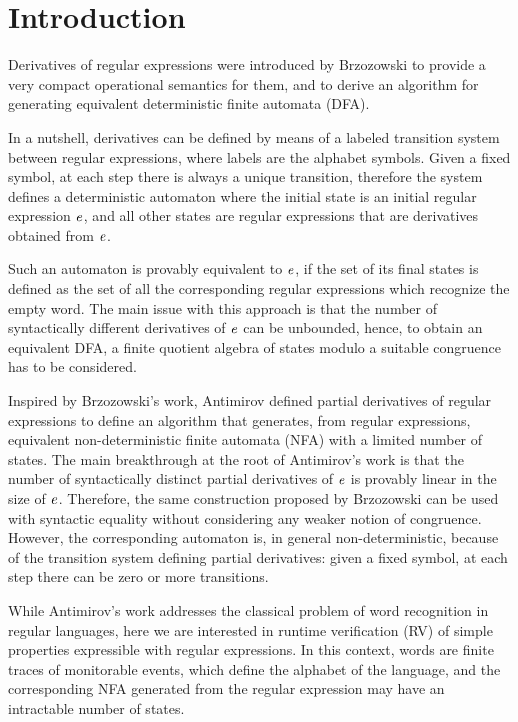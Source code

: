 \section{Introduction}\label{sec:intro}

Derivatives of regular expressions were introduced by Brzozowski \cite{Brzozowski64}
to provide a very compact operational semantics for them, and to derive an algorithm for generating equivalent deterministic finite automata (DFA).

In a nutshell, derivatives can be defined by means of a labeled transition system between regular expressions, where labels are the alphabet symbols. Given a fixed symbol, at each step there is always a unique transition, therefore the system defines a deterministic automaton where the initial state is an initial regular expression $\mathit {e}$, and all other states are regular expressions that are derivatives obtained from $\mathit {e}$.

Such an automaton is provably equivalent to $\mathit {e}$,
if the set of its final states is defined as the set of all the corresponding regular expressions which recognize the empty word.
The main issue with this approach is that the number of syntactically different derivatives of $\mathit {e}$ can be unbounded, hence, to obtain an equivalent DFA, a finite quotient algebra of states modulo a suitable congruence has to be considered.

Inspired by Brzozowski's work, Antimirov \cite{Antimirov96} defined partial derivatives of regular expressions to define an algorithm that generates, from regular expressions, equivalent non-deterministic finite automata (NFA) with a limited number of states. The main breakthrough at the root of Antimirov's work is that the number of syntactically distinct partial derivatives of $\mathit {e}$ is provably linear in the size of $\mathit {e}$. Therefore, the same construction
proposed by Brzozowski can be used with syntactic equality without considering any weaker notion of congruence. However, the corresponding automaton is, in general non-deterministic, because
of the transition system defining partial derivatives: given a fixed symbol, at each step there can be zero or more transitions.

While Antimirov's work addresses the classical problem of word recognition in regular languages, here we are interested in runtime verification (RV) of simple properties expressible with regular expressions. In this context,  words are finite traces of monitorable events, which define the alphabet of the language, and the corresponding NFA generated from the regular expression may have an intractable number of states.

